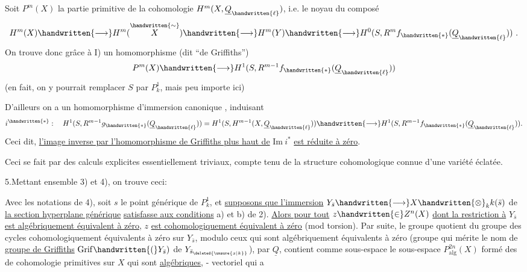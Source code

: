 Soit $P^m(X)$ la partie primitive de la cohomologie $H^m(X,\underline{Q}_{\handwritten{\ell}})$, i.e. le noyau du composé
\[
H^m(X)\handwritten{\longrightarrow}H^m(\overset{\handwritten{\sim}}{X})\handwritten{\longrightarrow}H^m(Y)\handwritten{\longrightarrow}H^0(S,R^m f_{\handwritten{*}}(\underline{Q}_{\handwritten{\ell}}))\ .
\]
On trouve donc grâce à I) un homomorphisme (dit ``de Griffiths'')
\[
P^m(X)\handwritten{\longrightarrow}H^1(S,R^{m-1}f_{\handwritten{*}}(\underline{Q}_{\handwritten{\ell}}))
\]
(en fait, on y pourrait remplacer $S$ par $P^1_k$, mais  peu importe ici)

D'ailleurs  on a un homomorphisme d'immersion canonique
\noindent ,
induisant
\[
i^{\handwritten{*}}:\quad H^1(S,R^{m-1}g_{\handwritten{*}}(\underline{Q}_{\handwritten{\ell}}))=H^1(S,H^{m-1}(X,\underline{Q}_{\handwritten{\ell}}))\handwritten{\longrightarrow}H^1(S,R^{m-1}f_{\handwritten{*}}(\underline{Q}_{\handwritten{\ell}})).
\]
Ceci dit, \uline{l'image inverse par l'homomorphisme de Griffiths plus haut de} $\mathrm{Im}\ i^*$ \uline{est réduite à zéro}.

Ceci se fait par des calculs explicites essentiellement triviaux, compte tenu de la structure cohomologique connue d'une variété éclatée.

5.\quad Mettant ensemble 3) et 4), on trouve ceci:

 Avec les notations de 4),  soit $s$ le point générique de $P^1_k$, et \uline{supposons que l'immersion} $Y_{\bar s}\handwritten{\longrightarrow}X\handwritten{\otimes}_k k(\bar s)$ de \uline{la section hyperplane générique}  \uline{satisfasse aux conditions} a) et b) de 2). \uline{Alors pour tout} $z\handwritten{\in}Z^n(X)$ \uline{dont la restriction à} $Y_{\bar s}$ \uline{est algébriquement équivalent à zéro}, $z$ \uline{est cohomologiquement équivalent à zéro} (mod torsion).  Par suite, le groupe quotient du groupe des cycles cohomologiquement équivalents à zéro  sur $Y_{\bar s}$, modulo ceux qui sont algébriquement équivalents à zéro (groupe qui mérite le nom de \uline{groupe de Griffiths} $\mathrm{Grif}\handwritten{(}Y_{\bar s})$ de $Y_{\bar s_{\deleted{\unsure{x|k}}}}$),  par $\underline{Q}$, contient comme sous-espace le sous-espace $P^{2n}_{\mathrm{alg}}(X)$ formé des  de cohomologie primitives sur $X$ qui sont \uline{algébriques}, - vectoriel qui a
